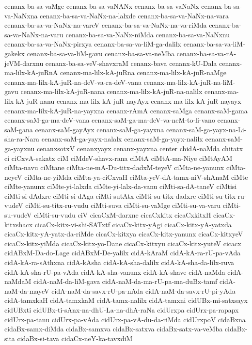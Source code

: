 {cenanx-ba-sa-vaMge
cenanx-ba-sa-vaNANx
cenanx-ba-sa-vaNaNx
cenanx-ba-sa-va-NaNxna
cenanx-ba-sa-va-NaNx-na-lalxde
cenanx-ba-sa-va-NaNx-na-vara
cenanx-ba-sa-va-NaNx-na-vareV
cenanx-ba-sa-va-NaNx-na-va-riMda
cenanx-ba-sa-va-NaNx-na-varu
cenanx-ba-sa-va-NaNx-niMda
cenanx-ba-sa-va-NaNxnu
cenanx-ba-sa-va-NaNx-pirxya
cenanx-ba-sa-va-liM-ga-dalilx
cenanx-ba-sa-va-liM-gakekx
cenanx-ba-sa-va-liM-gavu
cenanx-ba-sa-va-neMba
cenanx-ba-sa-va-rA-jeVM-darxnu
cenanx-ba-sa-veV-shavxraM
cenanx-bava
cenanx-kU-Dala
cenanx-ma-lilx-kA-juRnA
cenanx-ma-lilx-kA-juRna
cenanx-ma-lilx-kA-juR-naMge
cenanx-ma-lilx-kA-juR-na-deV-va-ra-deV-vana
cenanx-ma-lilx-kA-juR-na-liM-gavu
cenanx-ma-lilx-kA-juR-nana
cenanx-ma-lilx-kA-juR-na-nalilx
cenanx-ma-lilx-kA-juR-nanu
cenanx-ma-lilx-kA-juR-nayAyx
cenanx-ma-lilx-kA-juR-nayayx
cenanx-ma-lilx-kA-juR-na-yayxna
cenanx-rAmA
cenanx-saMga
cenanx-saM-gama
cenanx-saM-ga-ma-deV-vana
cenanx-saM-ga-ma-deV-va-neM-to-li-vano
cenanx-saM-gana
cenanx-saM-gayAyx
cenanx-saM-ga-yayxna
cenanx-saM-ga-yayx-na-Li-sha-ra-Nara
cenanx-saM-ga-yayx-nalalx
cenanx-saM-ga-yayx-nalilx
cenanx-saM-ga-yayxnu
cenanxsotxV
cenanxyayx
cenanx-yayxna
center
chidA-naMda
chitatx
ci
ciCxvA-sakatx
ciM
ciMdeV-shavx-rana
ciMtA
ciMtA-ma-Niye
ciMtAyAM
ciMta-navu
ciMtane
ciMta-ne-mA-Du-titx-dadxM-teyeV
ciMta-ne-yanunx
ciMta-neyeV
ciMta-ne-yiMda
ciMta-ya-ciCxvaH
ciMta-yeV-dA-tamx-niV-shAnaM
ciMte
ciMte-yanunx
ciMte-yi-lalxda
ciMte-yi-lalx-da-vanu
ciMti-sa-dA-taneV
ciMtisi
ciMti-si-dAdxre
ciMti-si-dAga
ciMti-sutAtx
ciMti-su-titx-dadxre
ciMti-su-titx-ru-vudeV
ciMti-su-titx-ru-vudu
ciMti-suva
ciMti-su-vaMge
ciMti-su-va-varu
ciMti-su-vudeV
ciMti-su-vudu
ciV
cicaCxM-darxne
cicaCxkitx
cicaCxkitxH
cicaCx-kitxshacx
cicaCx-kitx-vi-shi-SATxtf
cicaCx-kitx-yAgi
cicaCx-kitx-yA-yatxda
cicaCx-kitx-yA-yatx-da-riMde
cicaCx-kitxya
cicaCx-kitx-yanunx
cicaCx-kitxyeV
cicaCx-kitx-yiMda
cicaCx-kitx-yo-Dane
cicaCx-kitxyu
cicaCx-kitx-yuteV
cicacx
cidABxM-Da-do-Lage
cidABxM-De-yalilx
cidA-kAraM
cidA-kA-ra-rU-pa-vAda
cidA-kA-ra-sAthxna
cidA-kAsha
cidA-kA-sha-dalilx
cidA-kA-sha-da-lilx-ruva
cidA-kA-sha-rU-pa-vAda
cidA-kA-sha-vanunx
cidA-kA-shave
cidA-naMda
cidA-naMdaM
cidA-naM-da-liM-gava
cidA-naM-da-ma-rU-pa-ma-duBx-tamf
cidA-naM-da-mayeV
cidA-naM-da-savx-rU-pa-nAda
cidA-naM-da-savx-rU-pi-yAda
cidA-tamxkaH
cidA-tamxkaM
cidA-tamx-nalilx
cidA-tamxni
cidUBx-mi-satxsayx
cidUBxti
cidUBx-ti-sAnx-na-dhU-La-na-dhA-raNa
cidUrxpa
cidUrx-pa-rapapx
cidUrx-pa-tanu
cidUrx-pa-vAda
cidUrx-pa-vA-du-da-riMda
cidUrxpoV
cidaBxna
cidaBx-samx-diMda
cidaBx-samxva
cidaBx-satxva
cidaBx-satx-va-veMba
cidaBx-sita
cidaBx-si-tava
cidaCx-neY-ka-tavxdiM
}
